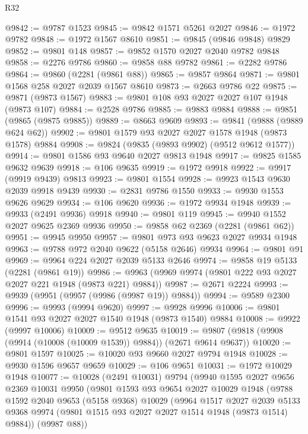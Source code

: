 \begin{lexlean}{R32}
\begin{coremodule}
@9842 := @9787 @1523
@9845 := @9842 @1571 @5261 @2027
@9846 := @1972 @9782
@9848 := @1972 @1567 @8610
@9851 := @9845 (@9846 @9848) @9829
@9852 := @9801 @148
@9857 := @9852 @1570 @2027 @2040 @9782 @9848
@9858 := @2276 @9786
@9860 := @9858 @88 @9782
@9861 := @2282 @9786
@9864 := @9860 (@2281 (@9861 @88))
@9865 := @9857 @9864
@9871 := @9801 @1568 @258 @2027 @2039 @1567 @8610
@9873 := @2663 @9786 @22
@9875 := @9871 (@9873 @1567)
@9883 := @9801 @108 @93 @2027 @2027 @107 @1948 (@9873 @107)
@9884 := @2528 @9786
@9885 := @9883 @9884
@9888 := @9851 (@9865 (@9875 @9885))
@9889 := @8663 @9609
@9893 := @9841 (@9888 (@9889 @624 @62))
@9902 := @9801 @1579 @93 @2027 @2027 @1578 @1948 (@9873 @1578) @9884
@9908 := @9824 (@9835 (@9893 @9902) (@9512 @9612 @1577))
@9914 := @9801 @1586 @93 @9640 @2027 @9813 @1948
@9917 := @9825 @1585 @9632 @9639
@9918 := @106 @9635
@9919 := @1972 @9918
@9922 := @9917 (@9919 @9439) @9813
@9923 := @9801 @1554
@9928 := @9923 @1543 @9630 @2039 @9918 @9439
@9930 := @2831 @9786 @1550
@9933 := @9930 @1553 @9626 @9629
@9934 := @106 @9620
@9936 := @1972 @9934 @1948
@9939 := @9933 (@2491 @9936) @9918
@9940 := @9801 @119
@9945 := @9940 @1552 @2027 @9625 @2369 @9936
@9950 := @9858 @62 @2369 (@2281 (@9861 @62))
@9951 := @9945 @9950
@9957 := @9801 @973 @93 @9623 @2027 @9934 @1948
@9963 := @9788 @972 @2040 @9622 (@5158 @2646) @9934
@9964 := @9801 @91
@9969 := @9964 @224 @2027 @2039 @5133 @2646
@9974 := @9858 @19 @5133 (@2281 (@9861 @19))
@9986 := @9963 (@9969 @9974 (@9801 @222 @93 @2027 @2027 @221 @1948 (@9873 @221) @9884))
@9987 := @2671 @2224
@9993 := @9939 (@9951 (@9957 (@9986 (@9987 @19)) @9884))
@9994 := @9589 @2300
@9996 := @9993 (@9994 @9620)
@9997 := @9928 @9996
@10006 := @9801 @1541 @93 @2027 @2027 @1540 @1948 (@9873 @1540) @9884
@10008 := @9922 (@9997 @10006)
@10009 := @9512 @9635
@10019 := @9807 (@9818 (@9908 (@9914 (@10008 (@10009 @1539)) @9884)) (@2671 @9614 @9637))
@10020 := @9801 @1597
@10025 := @10020 @93 @9660 @2027 @9794 @1948
@10028 := @9930 @1596 @9657 @9659
@10029 := @106 @9651
@10031 := @1972 @10029 @1948
@10077 := @10028
    (@2491 @10031)
    @9794
    (@9940
      @1595
      @2027
      @9656
      @2369
      @10031
      @9950
      (@9801
        @1593
        @93
        @9654
        @2027
        @10029
        @1948
        (@9788
          @1592
          @2040
          @9653
          (@5158 @9368)
          @10029
          (@9964
            @1517
            @2027
            @2039
            @5133
            @9368
            @9974
            (@9801 @1515 @93 @2027 @2027 @1514 @1948 (@9873 @1514) @9884))
          (@9987 @88))

\end{coremodule}
\end{lexlean}
